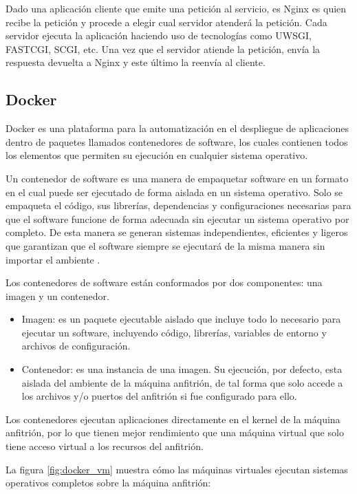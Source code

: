 Dado una aplicación cliente que emite una petición al servicio, es Nginx es quien recibe la petición y procede a elegir cual servidor
atenderá la petición. Cada servidor ejecuta la aplicación haciendo uso de tecnologías como UWSGI, FASTCGI, SCGI, etc. Una vez que el
servidor atiende la petición, envía la respuesta devuelta a Nginx y este último la reenvía al cliente.


\subsection{Docker}

Docker es una plataforma para la automatización en el despliegue de aplicaciones dentro de paquetes llamados contenedores de software,
los cuales contienen todos los elementos que permiten su ejecución en cualquier sistema operativo.

Un contenedor de software es una manera de empaquetar software en un formato en el cual puede ser ejecutado de forma aislada en un sistema
operativo. Solo se empaqueta el código, sus librerías, dependencias y configuraciones necesarias para que el
software funcione de forma adecuada sin ejecutar un sistema operativo por completo.
De esta manera se generan sistemas independientes, eficientes y ligeros que garantizan
que el software siempre se ejecutará de la misma manera sin importar el ambiente \cite{21}.

Los contenedores de software están conformados por dos componentes: una imagen y un contenedor.

\begin{itemize}
\item Imagen: es un paquete ejecutable aislado que incluye todo lo necesario para ejecutar un software, incluyendo código,
librerías, variables de entorno y archivos de configuración.

\item Contenedor: es una instancia de una imagen. Su ejecución, por defecto, esta aislada del ambiente de la máquina anfitrión,
de tal forma que solo accede a los archivos y/o puertos del anfitrión si fue configurado para ello.
\end{itemize}

Los contenedores ejecutan aplicaciones directamente en el kernel de la máquina anfitrión, por lo que tienen mejor rendimiento que una máquina virtual que solo tiene acceso virtual a los recursos del anfitrión.

La figura \ref{fig:docker_vm} muestra cómo las máquinas virtuales ejecutan sistemas operativos completos sobre la máquina anfitrión:

